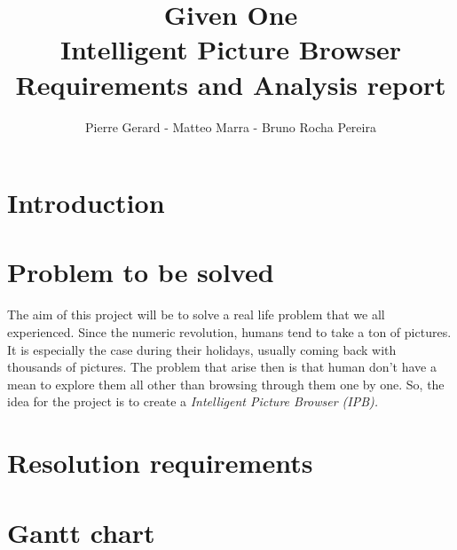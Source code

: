 \documentclass[11pt,a4paper]{article}
\author{Pierre Gerard - Matteo Marra - Bruno Rocha Pereira}
\title{Given One \\ Intelligent Picture Browser \\ Requirements and Analysis report}
\begin{document}
\maketitle

\section{Introduction}

\section{Problem to be solved}

The aim of this project will be to solve a real life problem that we all experienced. Since the numeric revolution, humans tend to take a ton of pictures. It is especially the case during their holidays, usually coming back with thousands of pictures. The problem that arise then is that human don't have a mean to explore them all other than browsing through them one by one. So, the idea for the project is to create a \textit{Intelligent Picture Browser (IPB).}
 
\section{Resolution requirements}

\section{Gantt chart}
\end{document}
